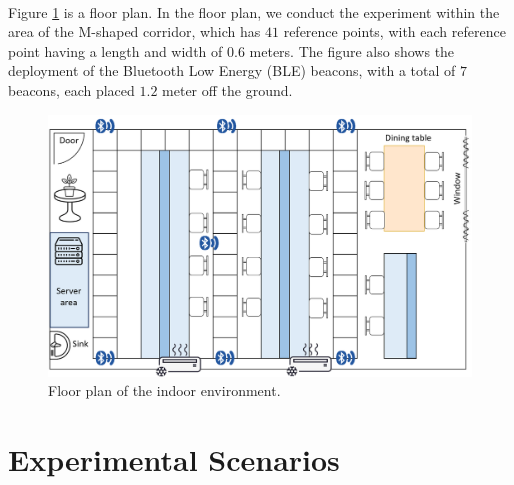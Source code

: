 \documentclass[a4paper,12pt]{report}
\begin{document}
\paragraph{}
Figure \ref{Fig:floor_plan} is a floor plan. In the floor plan, we conduct the experiment within the area of the M-shaped corridor, which has $41$ reference points, with each reference point having a length and width of $0.6$ meters. The figure also shows the deployment of the Bluetooth Low Energy (BLE) beacons, with a total of $7$ beacons, each placed $1.2$ meter off the ground.
\begin{figure}[htbp]
    \begin{center}
    \includegraphics[width=\columnwidth]{images/chap4/floor_plan.png}
    \caption{Floor plan of the indoor environment.}
    \label{Fig:floor_plan}
    \end{center}
\end{figure}

\section{Experimental Scenarios}
\end{document}
